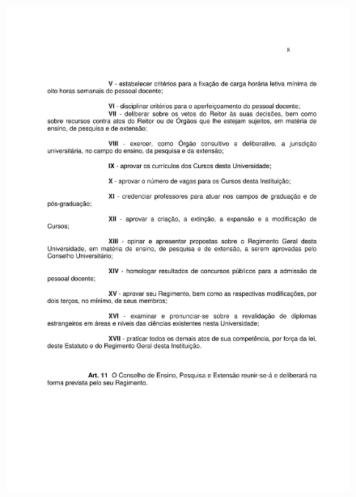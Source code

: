 \begin{figure}[p]
	\centering 
	\includegraphics[scale=0.7]{capitulos/resolucoes/cuni414/cuni414-8.pdf}
\end{figure}

